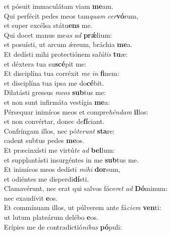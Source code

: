 \oddverse et pósuit immaculátam viam \textbf{me}am.\\
\evenverse Qui perfécit pedes meos tam\textit{quam} \textit{cer}\textbf{vó}rum,~\*\\
\evenverse et super excélsa státu\textbf{ens} me.\\
\oddverse Qui docet manus me\textit{as} \textit{ad} \textbf{prǽ}lium:~\*\\
\oddverse et posuísti, ut arcum ǽreum, bráchia \textbf{me}a.\\
\evenverse Et dedísti mihi protectiónem sa\textit{lú}\textit{tis} \textbf{tu}æ:~\*\\
\evenverse et déxtera tua su\textbf{scé}pit me:\\
\oddverse Et disciplína tua corréxit \textit{me} \textit{in} \textbf{fi}nem:~\*\\
\oddverse et disciplína tua ipsa me do\textbf{cé}bit.\\
\evenverse Dilatásti gressus \textit{me}\textit{os} \textbf{sub}tus me:~\*\\
\evenverse et non sunt infirmáta vestígia \textbf{me}a:\\
\oddverse Pérsequar inimícos meos et compre\textit{hén}\textit{dam} \textbf{il}los:~\*\\
\oddverse et non convértar, donec de\textbf{fí}ciant.\\
\evenverse Confríngam illos, nec pó\textit{te}\textit{runt} \textbf{sta}re:~\*\\
\evenverse cadent subtus pedes \textbf{me}os.\\
\oddverse Et præcinxísti me virtú\textit{te} \textit{ad} \textbf{bel}lum:~\*\\
\oddverse et supplantásti insurgéntes in me \textbf{sub}tus me.\\
\evenverse Et inimícos meos dedísti \textit{mi}\textit{hi} \textbf{dor}sum,~\*\\
\evenverse et odiéntes me disperdi\textbf{dí}sti.\\
\oddverse Clamavérunt, nec erat qui salvos fáce\textit{ret} \textit{ad} \textbf{Dó}minum:~\*\\
\oddverse nec exaudívit \textbf{e}os.\\
\evenverse Et commínuam illos, ut púlverem ante fá\textit{ci}\textit{em} \textbf{ven}ti:~\*\\
\evenverse ut lutum plateárum delébo \textbf{e}os.\\
\oddverse Erípies me de contradictió\textit{ni}\textit{bus} \textbf{pó}puli:~\*\\
